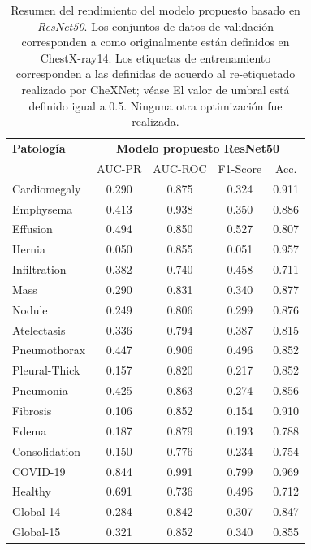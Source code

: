 \begin{table}[tb]
    \centering
    \begin{tabular}{|l||c|c|c|c|}
        \hline
    {\bf Patología} 	    	&	\multicolumn{4}{c|}{\bf Modelo propuesto ResNet50}  \\
    \cline{2-5}
                        &	AUC-PR	&	AUC-ROC 	& F1-Score  & Acc.  \\
        \hline \hline
        Cardiomegaly	&	0.290	&	0.875	&	0.324	&	0.911	\\
        Emphysema	    &	0.413	&	0.938	&	0.350	&	0.886	\\
        Effusion	    &	0.494	&	0.850	&	0.527	&	0.807	\\
        Hernia	        &	0.050	&	0.855	&	0.051	&	0.957	\\
        Infiltration	&	0.382	&	0.740	&	0.458	&	0.711	\\
        Mass	        &	0.290	&	0.831	&	0.340	&	0.877	\\
        Nodule	        &	0.249	&	0.806	&	0.299	&	0.876	\\
        Atelectasis	    &	0.336	&	0.794	&	0.387	&	0.815	\\
        Pneumothorax	&	0.447	&	0.906	&	0.496	&	0.852	\\
        Pleural-Thick	&	0.157	&	0.820	&	0.217	&	0.852	\\
        Pneumonia	    &	0.425	&	0.863	&	0.274	&	0.856	\\
        Fibrosis	    &	0.106	&	0.852	&	0.154	&	0.910	\\
        Edema	        &	0.187	&	0.879	&	0.193	&	0.788	\\
        Consolidation	&	0.150	&	0.776	&	0.234	&	0.754	\\
        \hline
        COVID-19	    &	0.844	&	0.991	&	0.799	&	0.969	\\
        Healthy	        &	0.691	&	0.736	&	0.496	&	0.712	\\
        \hline\hline
        Global-14	    &	0.284	&	0.842	&	0.307	&	0.847	\\
        Global-15	    &	0.321	&	0.852	&	0.340	&	0.855	\\
    \hline
    \end{tabular}
    \caption{Resumen del rendimiento del modelo propuesto basado en \textit{ResNet50}.
            Los conjuntos de datos de validación corresponden a como originalmente
            están definidos en ChestX-ray14. Los etiquetas de entrenamiento corresponden a las
            definidas de acuerdo al re-etiquetado realizado por CheXNet; véase \cite{rajpurkar2018deep}
            El valor de umbral está definido igual a 0.5. Ninguna otra optimización fue realizada.}
    \label{table:res-model-covid}
\end{table}

